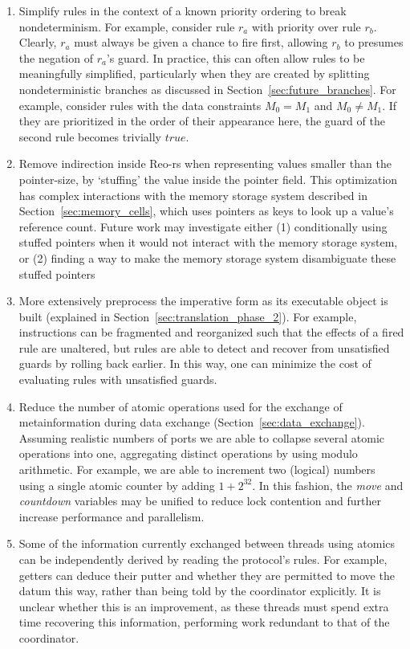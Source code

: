 \begin{enumerate}
	\item Simplify rules in the context of a known priority ordering to break nondeterminism. For example, consider rule $r_a$ with priority over rule $r_b$. Clearly, $r_a$ must always be given a chance to fire first, allowing $r_b$ to presumes the negation of $r_a$'s guard. In practice, this can often allow rules to be meaningfully simplified, particularly when they are created by splitting nondeterministic branches as discussed in Section~\ref{sec:future_branches}. For example, consider rules with the data constraints $M_0=M_1$ and $M_0\neq{}M_1$. If they are prioritized in the order of their appearance here, the guard of the second rule becomes trivially $true$.
	
	\item Remove indirection inside Reo-rs when representing values smaller than the pointer-size, by `stuffing' the value inside the pointer field. This optimization has complex interactions with the memory storage system described in Section~\ref{sec:memory_cells}, which uses pointers as keys to look up a value's reference count. Future work may investigate either (1) conditionally using stuffed pointers when it would not interact with the memory storage system, or (2) finding a way to make the memory storage system disambiguate these stuffed pointers
	
	
	\item More extensively preprocess the imperative form as its executable object is built (explained in Section~\ref{sec:translation_phase_2}). For example, instructions can be fragmented and reorganized such that the effects of a fired rule are unaltered, but rules are able to detect and recover from unsatisfied guards by rolling back earlier. In this way, one can minimize the cost of evaluating rules with unsatisfied guards.
	
	\item Reduce the number of atomic operations used for the exchange of metainformation during data exchange (Section~\ref{sec:data_exchange}). Assuming realistic numbers of ports we are able to collapse several atomic operations into one, aggregating distinct operations by using modulo arithmetic. For example, we are able to increment two (logical) numbers using a single atomic counter by adding $1 + 2^{32}$. In this fashion, the \textit{move} and \textit{countdown} variables may be unified to reduce lock contention and further increase performance and parallelism.
	
	\item Some of the information currently exchanged between threads using atomics can be independently derived by reading the protocol's rules. For example, getters can deduce their putter and whether they are permitted to move the datum this way, rather than being told by the coordinator explicitly. It is unclear whether this is an improvement, as these threads must spend extra time recovering this information, performing work redundant to that of the coordinator. 
\end{enumerate}
